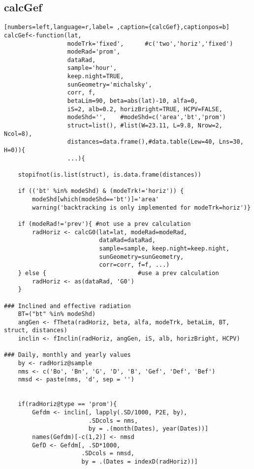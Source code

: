 \subsection{calcGef}
\label{sec:org02432d6}
\begin{lstlisting}[numbers=left,language=r,label= ,caption={calcGef},captionpos=b]
calcGef<-function(lat,
                  modeTrk='fixed',      #c('two','horiz','fixed')
                  modeRad='prom', 
                  dataRad,
                  sample='hour',
                  keep.night=TRUE,
                  sunGeometry='michalsky',
                  corr, f,
                  betaLim=90, beta=abs(lat)-10, alfa=0,
                  iS=2, alb=0.2, horizBright=TRUE, HCPV=FALSE,
                  modeShd='',    #modeShd=c('area','bt','prom')
                  struct=list(), #list(W=23.11, L=9.8, Nrow=2, Ncol=8), 
                  distances=data.frame(),#data.table(Lew=40, Lns=30, H=0)){
                  ...){

    stopifnot(is.list(struct), is.data.frame(distances))

    if (('bt' %in% modeShd) & (modeTrk!='horiz')) {
        modeShd[which(modeShd=='bt')]='area'
        warning('backtracking is only implemented for modeTrk=horiz')}

    if (modeRad!='prev'){ #not use a prev calculation
        radHoriz <- calcG0(lat=lat, modeRad=modeRad,
                           dataRad=dataRad,
                           sample=sample, keep.night=keep.night,
                           sunGeometry=sunGeometry,
                           corr=corr, f=f, ...)
    } else {                          #use a prev calculation
        radHoriz <- as(dataRad, 'G0') 
    } 

### Inclined and effective radiation
    BT=("bt" %in% modeShd) 
    angGen <- fTheta(radHoriz, beta, alfa, modeTrk, betaLim, BT, struct, distances)
    inclin <- fInclin(radHoriz, angGen, iS, alb, horizBright, HCPV)

### Daily, monthly and yearly values
    by <- radHoriz@sample
    nms <- c('Bo', 'Bn', 'G', 'D', 'B', 'Gef', 'Def', 'Bef')
    nmsd <- paste(nms, 'd', sep = '')


    if(radHoriz@type == 'prom'){
        Gefdm <- inclin[, lapply(.SD/1000, P2E, by),
                        .SDcols = nms,
                        by = .(month(Dates), year(Dates))]
        names(Gefdm)[-c(1,2)] <- nmsd
        GefD <- Gefdm[, .SD*1000,
                      .SDcols = nmsd,
                      by = .(Dates = indexD(radHoriz))]


\end{lstlisting}
